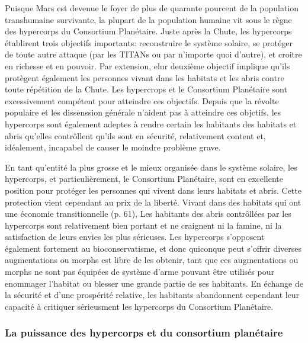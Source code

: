                Puisque Mars est devenue le foyer de plus de quarante pourcent de la population transhumaine survivante, la plupart de la population humaine vit sous le règne des hypercorps du Consortium Planétaire. Juste après la Chute, les hypercorps établirent trois objectifs importants: reconstruire le système solaire, se protéger de toute autre attaque (par les TITANs ou par n'importe quoi d'autre), et croitre en richesse et en pouvoir. Par extension, elur deuxième objectif implique qu'ils protègent également les personnes vivant dans les habitats et les abris contre toute répétition de la Chute. Les hypercrops et le Consortium Planétaire sont excessivement compétent pour atteindre ces objectifs. Depuis que la révolte populaire et les dissenssion générale n'aident pas à atteindre ces objctifs, les hypercorps sont également adeptes à rendre certain les habitants des habitats et abris qu'elles contrôllent qu'ils sont en sécurité, relativement content et, idéalement, incapabel de causer le moindre problème grave. 

               En tant qu'entité la plus grosse et le mieux organisée dans le système solaire, les hypercorps, et particulièrement, le Consortium Planétaire, sont en excellente position pour protéger les personnes qui vivent dans leurs habitats et abris. Cette protection vient cependant au prix de la liberté. Vivant dans des habitats qui ont une économie transitionnelle (p. 61), Les habitants des abris contrôllées par les hypercorps sont relativement bien portant et ne craignent ni la famine, ni la satisfaction de leurs envies les plus sérieuses. Les hypercorps s'opposent également fortement au bioconservatisme, et donc quiconque peut s'offrir diverses augmentations ou morphs est libre de les obtenir, tant que ces augmentations ou morphs ne sont pas équipées de système d'arme pouvant être utilisés pour enommager l'habitat ou blesser une grande partie de ses habitants. En échange de la sécurité et d'une prospérité relative, les habitants abandonnent cependant leur capacité à critiquer sérieusment les hypercorps du Consortium Planétaire. 

               \subsubsection{La puissance des hypercorps et du consortium planétaire} \label{sec:power-hyperc-plan} 

